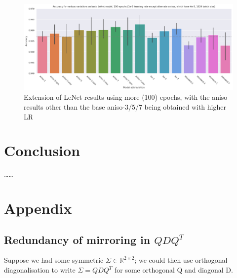 \documentclass[a4paper, 12pt]{report}
\def\comment#1{\color{red}#1\color{black}}
\begin{document}
\begin{figure}[h!]
	\center
  \includegraphics[width=\textwidth]{figures/100ep_extension.png}
  \caption{Extension of LeNet results using more (100) epochs, with the aniso results other than the base aniso-3/5/7 being obtained with higher LR}
  \label{fig:dil-illust}
\end{figure}


\chapter{Conclusion}
\comment{\ldots\ldots}




\newpage
\chapter{Appendix}
\section{Redundancy of mirroring in $QDQ^T$}
\label{sec:red-mirr}
Suppose we had some symmetric $\Sigma \in \mathbb{R}^{2\times 2}$; we could then use orthogonal diagonalisation to write $\Sigma = QDQ^T$ for some orthogonal Q and diagonal D.
\end{document}
